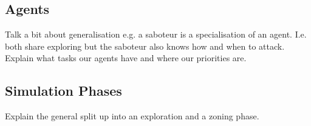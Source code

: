 \subsection{Agents}
Talk a bit about generalisation e.g. a saboteur is a specialisation of an agent. I.e. both share exploring but the saboteur also knows how and when to attack. Explain what tasks our agents have and where our priorities are.
\subsection{Simulation Phases}
Explain the general split up into an exploration and a zoning phase.
